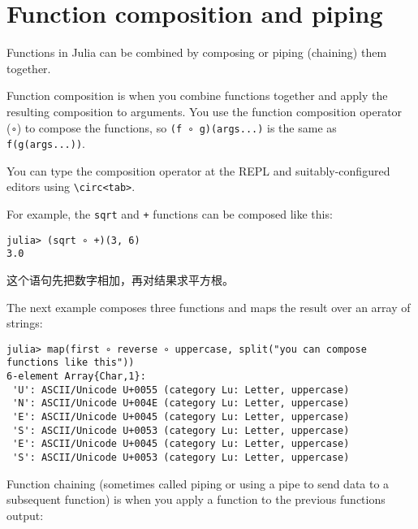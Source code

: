 \hypertarget{8022546101791804390}{}


\section{Function composition and piping}



Functions in Julia can be combined by composing or piping (chaining) them together.



Function composition is when you combine functions together and apply the resulting composition to arguments. You use the function composition operator (\texttt{∘}) to compose the functions, so \texttt{(f ∘ g)(args...)} is the same as \texttt{f(g(args...))}.



You can type the composition operator at the REPL and suitably-configured editors using \texttt{{\textbackslash}circ<tab>}.



For example, the \texttt{sqrt} and \texttt{+} functions can be composed like this:




\begin{verbatim}
julia> (sqrt ∘ +)(3, 6)
3.0
\end{verbatim}



这个语句先把数字相加，再对结果求平方根。



The next example composes three functions and maps the result over an array of strings:




\begin{verbatim}
julia> map(first ∘ reverse ∘ uppercase, split("you can compose functions like this"))
6-element Array{Char,1}:
 'U': ASCII/Unicode U+0055 (category Lu: Letter, uppercase)
 'N': ASCII/Unicode U+004E (category Lu: Letter, uppercase)
 'E': ASCII/Unicode U+0045 (category Lu: Letter, uppercase)
 'S': ASCII/Unicode U+0053 (category Lu: Letter, uppercase)
 'E': ASCII/Unicode U+0045 (category Lu: Letter, uppercase)
 'S': ASCII/Unicode U+0053 (category Lu: Letter, uppercase)
\end{verbatim}



Function chaining (sometimes called {\textquotedbl}piping{\textquotedbl} or {\textquotedbl}using a pipe{\textquotedbl} to send data to a subsequent function) is when you apply a function to the previous function{\textquotesingle}s output:




